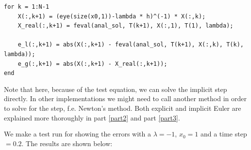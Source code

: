\begin{lstlisting}[caption = Implicit Euler Method Solver, captionpos=b, label=1_ImEuler, firstnumber=14]
for k = 1:N-1
    X(:,k+1) = (eye(size(x0,1))-lambda * h)^(-1) * X(:,k);
    X_real(:,k+1) = feval(anal_sol, T(k+1), X(:,1), T(1), lambda);
    
    e_l(:,k+1) = abs(X(:,k+1) - feval(anal_sol, T(k+1), X(:,k), T(k), lambda));
    e_g(:,k+1) = abs(X(:,k+1) - X_real(:,k+1));
end
\end{lstlisting}
Note that here, because of the test equation, we can solve the implicit step directly. In other implementations we might need to call another method in order to solve for the step, f.e. Newton's method. Both explicit and implicit Euler are explained more thoroughly in part \ref{part2} and part \ref{part3}.

We make a test run for showing the errors with a $\lambda = -1$, $x_0=1$ and a time step $=0.2$. The results are shown below:

